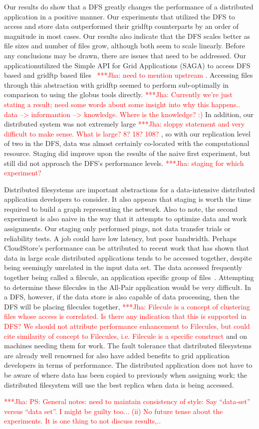 \documentclass[a4paper,11pt]{article}
\newcommand{\jhanote}[1]{ {\textcolor{red} { ***Jha: #1 }}}
\newcommand{\jhanote}[1]{}
\begin{document}
Our results do show that a DFS greatly changes the performance of a distributed application in a positive manner. Our experiments that utilized the DFS to access and store data outperformed their gridftp counterparts by an order of magnitude in most cases. Our results also indicate that the DFS scales better as file sizes and number of files grow, although both seem to scale linearly. Before any conclusions may be drawn, there are issues that need to be addressed. Our applicationutilized the Simple API for Grid Applications (SAGA) to access DFS based and gridftp based files~\cite{saga_web} \jhanote{need to mention upstream}. Accessing files through this abstraction with gridftp seemed to perform sub-optimally in comparison to using the globus tools directly. \jhanote{ Currently we're just stating a result; need some words about some insight into why this happens.. data --> informantion --> knowledge. Where is the knowledge? :) } In addition, our distributed system was not extremely large \jhanote{sloppy statement and very difficult to make sense. What is large? 8? 18? 108?}, so with our replication level of two in the DFS, data was almost certainly co-located with the computational resource. Staging did improve upon the results of the naive first experiment, but still did not approach the DFS's performance levels. \jhanote{staging for which experiment?}

Distributed filesystems are important abstractions for a data-intensive distributed application developers to consider. It also appears that staging is worth the time required to build a graph representing the network. Also to note, the second experiment is also naive in the way that it attempts to optimize data and work assignments. Our staging only performed pings, not data transfer trials or reliability tests. A job could have low latency, but poor bandwidth. Perhaps CloudStore's performance can be attributed to recent work that has shown that data in large scale distributed applications tends to be accessed together, despite being seemingly unrelated in the input data set. The data accessed frequently together being called a filecule, an application specific group of files~\cite{filecule}. Attempting to determine these filecules in the All-Pair application would be very difficult. In a DFS, however, if the data store is also capable of data processing, then the DFS will be placing filecules together, \jhanote{Filecule is a concept of clustering files whose access is correlated. Is there any indication that this is supported in DFS? We should not attribute 
performance enhancement to Filecules, but could cite similarity of concept to Filecules, i.e. Filecule is a specific construct}
and on machines needing them for work. The fault tolerance that distributed filesystems are already well renowned for also have added benefits to grid application developers in terms of performance. The distributed application does not have to be aware of where data has been copied to previously when assigning work; the distributed filesystem will use the best replica when data is being accessed.


\jhanote{PS: General notes: need to maintain consistency of style: Say ``data-set'' versus ``data set''. I might be guilty too...  (ii) No future tense about the
experiments. It is one thing to not discuss results,.. }


 

\end{document}
